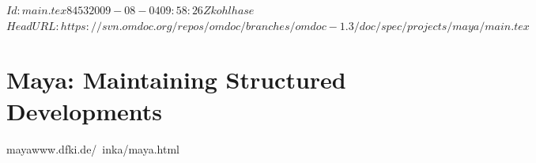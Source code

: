\svnInfo $Id: main.tex 8453 2009-08-04 09:58:26Z kohlhase $
\svnKeyword $HeadURL: https://svn.omdoc.org/repos/omdoc/branches/omdoc-1.3/doc/spec/projects/maya/main.tex $

\section[{\sc Maya}]{Maya: Maintaining Structured Developments}
\begin{project}{maya}{www.dfki.de/~inka/maya.html}
\end{project}

